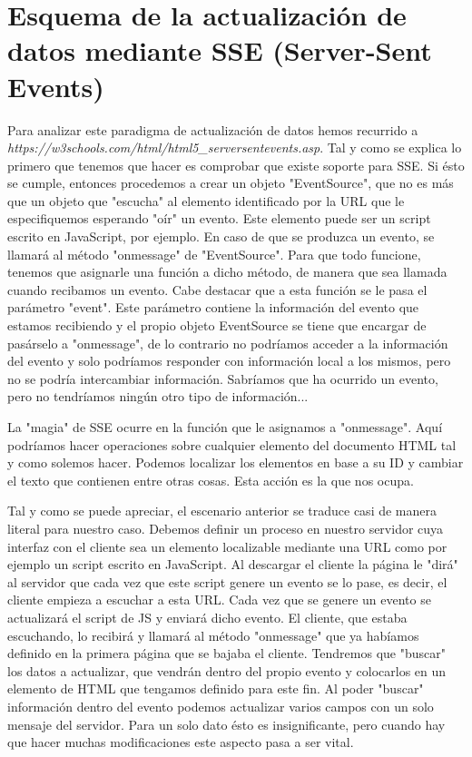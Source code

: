 \documentclass{article}[13pt]
\begin{document}
  \maketitle

  \section{Esquema de la actualización de datos mediante SSE (Server-Sent Events)}
    Para analizar este paradigma de actualización de datos hemos recurrido a \textit{https://w3schools.com/html/html5_serversentevents.asp}. Tal y como se explica lo primero que tenemos que hacer es comprobar que existe soporte para SSE. Si ésto se cumple, entonces procedemos a crear un objeto "EventSource", que no es más que un objeto que "escucha" al elemento identificado por la URL que le especifiquemos esperando "oír" un evento. Este elemento puede ser un script escrito en JavaScript, por ejemplo. En caso de que se produzca un evento, se llamará al método "onmessage" de "EventSource". Para que todo funcione, tenemos que asignarle una función a dicho método, de manera que sea llamada cuando recibamos un evento. Cabe destacar que a esta función se le pasa el parámetro "event". Este parámetro contiene la información del evento que estamos recibiendo y el propio objeto EventSource se tiene que encargar de pasárselo a "onmessage", de lo contrario no podríamos acceder a la información del evento y solo podríamos responder con información local a los mismos, pero no se podría intercambiar información. Sabríamos que ha ocurrido un evento, pero no tendríamos ningún otro tipo de información...

    La "magia" de SSE ocurre en la función que le asignamos a "onmessage". Aquí podríamos hacer operaciones sobre cualquier elemento del documento HTML tal y como solemos hacer. Podemos localizar los elementos en base a su ID y cambiar el texto que contienen entre otras cosas. Esta acción es la que nos ocupa.

    Tal y como se puede apreciar, el escenario anterior se traduce casi de manera literal para nuestro caso. Debemos definir un proceso en nuestro servidor cuya interfaz con el cliente sea un elemento localizable mediante una URL como por ejemplo un script escrito en JavaScript. Al descargar el cliente la página le "dirá" al servidor que cada vez que este script genere un evento se lo pase, es decir, el cliente empieza a escuchar a esta URL. Cada vez que se genere un evento se actualizará el script de JS y enviará dicho evento. El cliente, que estaba escuchando, lo recibirá y llamará al método "onmessage" que ya habíamos definido en la primera página que se bajaba el cliente. Tendremos que "buscar" los datos a actualizar, que vendrán dentro del propio evento y colocarlos en un elemento de HTML que tengamos definido para este fin. Al poder "buscar" información dentro del evento podemos actualizar varios campos con un solo mensaje del servidor. Para un solo dato ésto es insignificante, pero cuando hay que hacer muchas modificaciones este aspecto pasa a ser vital.
\end{document}
